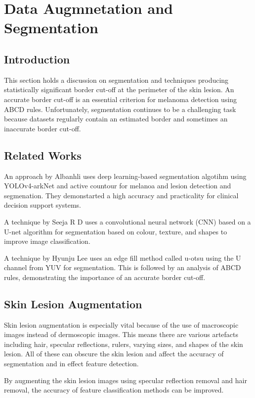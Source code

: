 \chapter{Data Augmnetation and Segmentation}

\section{Introduction}
This section holds a discussion on segmentation and  techniques producing statistically significant border cut-off at the perimeter of the skin lesion. An accurate border cut-off is an essential criterion for melanoma detection\cite{Pereira2020, Kaya2016} using ABCD rules. Unfortunately, segmentation continues to be a challenging task because datasets regularly contain an estimated border and sometimes an inaccurate border cut-off.

\section{Related Works}
An approach by Albanhli\cite{Albahli2020} uses deep learning-based segmentation algotihm using YOLOv4-arkNet and active countour for melanoa and lesion detection and segmenation. They demonstarted a high accuracy and practicality for clinical decision support systems.

A technique by Seeja R D\cite{seeja2019} uses a convolutional neural network (CNN) based on a U-net algorithm for segmentation based on colour, texture, and shapes to improve image classification.

A technique by Hyunju Lee\cite{Lee2020} uses an edge fill method called u-otsu using the U channel from YUV for segmentation. This is followed by an analysis of ABCD rules, demonstrating the importance of an accurate border cut-off.

\section{Skin Lesion Augmentation}
Skin lesion augmentation is especially vital because of the use of macroscopic images instead of dermoscopic images. This means there are various artefacts including hair, specular reflections, rulers, varying sizes, and shapes of the skin lesion. All of these can obscure the skin lesion and affect the accuracy of segmentation\cite{Unver2019} and in effect feature detection.

By augmenting the skin lesion images using specular reflection removal and hair removal, the accuracy of feature classification methods can be improved\cite{kasmi2023}. 

